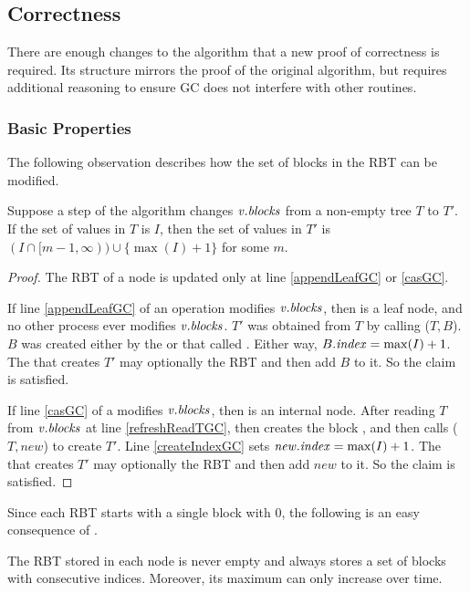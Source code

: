 
\subsection{Correctness}
There are enough changes to the algorithm that a new proof of correctness
is required.  Its structure mirrors the proof of the original algorithm, but requires additional
reasoning to ensure GC does not interfere with other routines.

\subsubsection{Basic Properties}

The following observation describes
how the set of blocks in the RBT can be modified.

\begin{lemma}\label{RBTupdates}
Suppose a step of the algorithm changes $\mbox{\textnormal{\textit{v}}}.\mbox{\textit{blocks}}$ from a non-empty tree $T$ to $T'$.
If the set of  values  in $T$ is $I$, then the set of  values in $T'$ is 
$(I \cap [m-1,\infty))\cup \{\max(I) + 1\}$ for some $m$.
\end{lemma}
\begin{proof}
The RBT of a node is updated only at line \ref{appendLeafGC} or \ref{casGC}.

If line \ref{appendLeafGC} of an  operation modifies $\mbox{\textnormal{\textit{v}}}.\mbox{\textit{blocks}}$,
then  is a leaf node, and no other process ever modifies $\mbox{\textnormal{\textit{v}}}.\mbox{\textit{blocks}}$.
$T'$ was obtained from $T$ by calling ($T,B$).
$B$ was created either by the  or  that called .
Either way, $B.\mbox{\textit{index}} = \max(I)+1$.
The  that creates $T'$ may optionally  the RBT and then add $B$ to it.
So the claim is satisfied.

If line \ref{casGC} of a  modifies $\mbox{\textnormal{\textit{v}}}.\mbox{\textit{blocks}}$, then  is an internal node.
After reading $T$ from $\mbox{\textnormal{\textit{v}}}.\mbox{\textit{blocks}}$ at line \ref{refreshReadTGC},
then creates the  block ,
and then calls ($T,new$) to create $T'$.
Line \ref{createIndexGC} sets $\mbox{\textnormal{\textit{new}}}.\mbox{\textnormal{\textit{index}}} = \max(I)+1$.
The  that creates $T'$ may optionally  the RBT and then add $new$ to it.
So the claim is satisfied.
\end{proof}

Since each RBT starts with a single block with  0, the following is an easy consequence of .
\begin{corollary}\label{nonEmptyIncreasing}
The RBT stored in each node  is never empty and always stores a set of blocks with consecutive indices.
Moreover, its maximum  can only increase over time.
\end{corollary}


